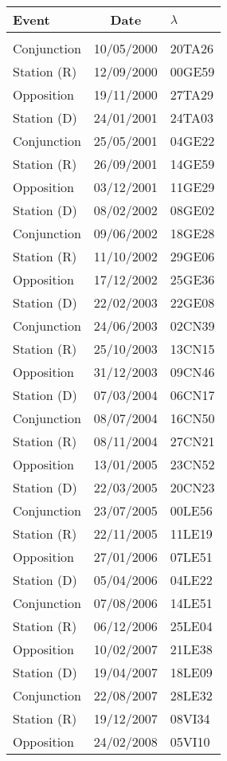 \newpage
\begin{table}\centering
{\small\begin{tabular}{lcl}
Event & Date &$\lambda$ \\\hline
&&\\[-1.75ex]
Conjunction & 10/05/2000 & 20TA26\\
Station (R) & 12/09/2000 & 00GE59\\
Opposition & 19/11/2000 & 27TA29\\
Station (D) & 24/01/2001 & 24TA03\\
Conjunction & 25/05/2001 & 04GE22\\
Station (R) & 26/09/2001 & 14GE59\\
Opposition & 03/12/2001 & 11GE29\\
Station (D) & 08/02/2002 & 08GE02\\
Conjunction & 09/06/2002 & 18GE28\\
Station (R) & 11/10/2002 & 29GE06\\
Opposition & 17/12/2002 & 25GE36\\
Station (D) & 22/02/2003 & 22GE08\\
Conjunction & 24/06/2003 & 02CN39\\
Station (R) & 25/10/2003 & 13CN15\\
Opposition & 31/12/2003 & 09CN46\\
Station (D) & 07/03/2004 & 06CN17\\
Conjunction & 08/07/2004 & 16CN50\\
Station (R) & 08/11/2004 & 27CN21\\
Opposition & 13/01/2005 & 23CN52\\
Station (D) & 22/03/2005 & 20CN23\\
Conjunction & 23/07/2005 & 00LE56\\
Station (R) & 22/11/2005 & 11LE19\\
Opposition & 27/01/2006 & 07LE51\\
Station (D) & 05/04/2006 & 04LE22\\
Conjunction & 07/08/2006 & 14LE51\\
Station (R) & 06/12/2006 & 25LE04\\
Opposition & 10/02/2007 & 21LE38\\
Station (D) & 19/04/2007 & 18LE09\\
Conjunction & 22/08/2007 & 28LE32\\
Station (R) & 19/12/2007 & 08VI34\\
Opposition & 24/02/2008 & 05VI10\\

\end{tabular}}
\end{table}
